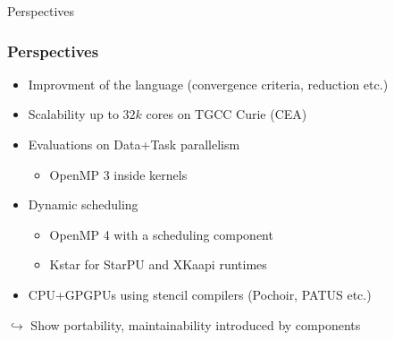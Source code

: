 \documentclass{beamer}
\begin{document}
\begin{frame}
\begin{block}{Perspectives}
\frametitle{Perspectives}
\begin{itemize}
\item Improvment of the language (convergence criteria, reduction etc.)
\item Scalability up to $32k$ cores on TGCC Curie (CEA)
\item Evaluations on Data+Task parallelism
\begin{itemize}
\item OpenMP 3 inside kernels
\end{itemize}
\item Dynamic scheduling
\begin{itemize}
\item OpenMP 4 with a scheduling component
\item Kstar for StarPU and XKaapi runtimes
\end{itemize}
\item CPU+GPGPUs using stencil compilers (Pochoir, PATUS etc.)
\end{itemize}
$\hookrightarrow$ Show portability, maintainability introduced by components
\end{block}
\end{frame}

\end{document}
